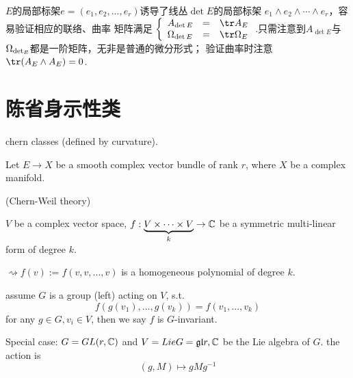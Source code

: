 $E$的局部标架$e=(e_1,e_2,...,e_r)$诱导了线丛$\det E$的局部标架
$e_1\wedge e_2\wedge\cdots\wedge e_r$，容易验证相应的联络、曲率
矩阵满足
$
  \left\{
    \begin{array}{lcl}
      A_{\det E} &=& \tr A_E\\
      \Omg_{\det E}&=& \tr\Omg_E
     \end{array}
  \right.
$.只需注意到$A_{\det E}$与$\Omega_{\det_E}$都是一阶矩阵，无非是普通的微分形式；
验证曲率时注意$\tr(A_E\wedge A_E)=0$.


\section{陈省身示性类}
chern classes (defined by curvature).

Let $E\to X$ be a smooth complex vector bundle of rank $r$,
where $X$ be a complex manifold.

(Chern-Weil theory)

$V$ be a complex vector space, $f:\underbrace{V\times\cdots\times V}_k\to \mathbb{C}$
be a symmetric multi-linear form of degree $k$.

$\rightsquigarrow f(v):=f(v,v,...,v)$ is a homogeneous polynomial of degree $k$.
\begin{definition}
assume $G$ is a group (left) acting on $V$, s.t.
$$f(g(v_1),...,g(v_k))=f(v_1,...,v_k)$$
for any $g\in G,v_i\in V$, then we say $f$ is $G$-invariant.
\end{definition}

Special case: $G=GL(r,\mathbb{C})$ and $V=Lie G=\mathfrak{gl}{r,\mathbb{C}}$ be the Lie algebra of $G$.
the action is
$$(g,M)\mapsto gMg^{-1}$$

